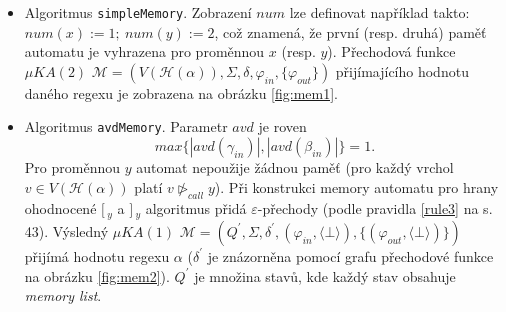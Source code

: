 \documentclass[thesis=B,czech]{FITthesis}[2019/12/23]
\theoremstyle{definition}
\begin{document}
\begin{itemize}
\item{Algoritmus \texttt{simpleMemory}.
Zobrazení $num$ lze definovat například takto: $num(x) := 1; \ num(y) := 2$, což znamená, že první (resp. druhá) paměť automatu je vyhrazena pro proměnnou $x$ (resp. $y$). Přechodová funkce $\mu KA(2)$ $\mathcal{M} = (V(\mathcal{H}(\alpha)), \Sigma, \delta, \varphi_{in}, \{\varphi_{out}\})$ přijímajícího hodnotu daného regexu je zobrazena na obrázku \ref{fig:mem1}. }
\item{Algoritmus \texttt{avdMemory}. Parametr $avd$ je roven $$max\{|avd(\gamma_{in})|, |avd(\beta_{in})|\}=1.$$ Pro proměnnou $y$ automat nepoužije žádnou paměť (pro každý vrchol $v \in V(\mathcal{H}(\alpha))$ platí $v \ntriangleright_{call} y$). Při konstrukci memory automatu pro hrany ohodnocené $[\,_y$ a $]\,_y$ algoritmus přidá $\varepsilon$-přechody (podle pravidla \ref{rule3} na s. 43). Výsledný $\mu KA(1)$ $\mathcal{M} = (Q^\prime, \Sigma, \delta^\prime, (\varphi_{in}, \langle \bot \rangle), \{ (\varphi_{out}, \langle \bot \rangle)\})$ přijímá hodnotu regexu $\alpha$ ($\delta^\prime$ je znázorněna pomocí grafu přechodové funkce na obrázku \ref{fig:mem2}). $Q^\prime$ je množina stavů, kde každý stav obsahuje \emph{memory list}. }
\end{itemize}
\end{document}

